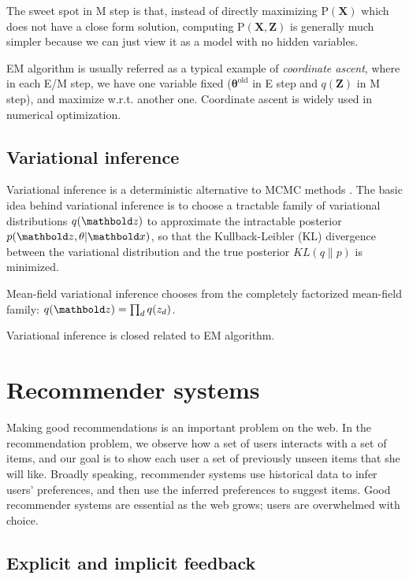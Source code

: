 The sweet spot in M step is that, instead of directly maximizing $\mathrm{P}(\mathbf{X})$ which does not have a close form solution, computing $\mathrm{P}(\mathbf{X, Z})$ is generally much simpler because we can just view it as a model with no hidden variables.

EM algorithm is usually referred as a typical example of \emph{coordinate ascent}, where in each E/M step, we have one variable fixed ($\boldsymbol{\theta}^{\text{old}}$ in E step and $q(\mathbf{Z})$ in M step), and maximize w.r.t. another one. Coordinate ascent is widely used in numerical optimization.


\subsection{Variational inference}\label{chpt:background:sec:vi}

\PP Variational inference is a deterministic alternative to \gls{MCMC} methods \citep{jordan1999introduction,wainwright2008graphical,blei2016variational}. The basic idea behind variational inference is to choose a tractable family of variational distributions $q(\mbz)$ to approximate the intractable posterior $p(\mbz, \theta | \mbx)$, so that the Kullback-Leibler
(KL) divergence between the variational distribution and the true posterior $KL(q \| p)$ is minimized.

\PP Mean-field variational inference chooses from the completely factorized mean-field family: $q(\mbz) = \prod_d q(z_d)$.

\PP Variational inference is closed related to \gls{EM} algorithm. 

\section{Recommender systems}\label{chpt:background:sec:recsys}

Making good recommendations is an important problem on the web. In the
recommendation problem, we observe how a set of users interacts with a
set of items, and our goal is to show each user a set of previously
unseen items that she will like.  Broadly speaking, recommender
systems use historical data to infer users' preferences, and then use
the inferred preferences to suggest items.  Good recommender
systems are essential as the web grows; users are overwhelmed with
choice.

\subsection{Explicit and implicit feedback} \label{chpt:background:sec:data}

